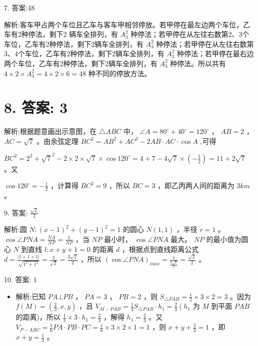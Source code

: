 \documentclass[10pt]{article}
\begin{document}
7. 答案:48

解析:客车甲占两个车位且乙车与客车甲相邻停放。若甲停在最左边两个车位，乙车有2种停法，剩下2 辆车全排列，有 \({A}_{3}^{2}\) 种停法；若甲停在从左往右数第2、3个车位，乙车有2种停法，剩下2辆车全排列，有 \({A}_{3}^{2}\) 种停法；若甲停在从左往右数第3、4个车位，乙车有2种停法，剩下2辆车全排列，有 \({A}_{3}^{2}\) 种停法；若甲停在最右边两个车位，乙车有2种停法，剩下2辆车全排列，有 \({A}_{3}^{2}\) 种停法。所以共有 \(4 \times  2 \times  {A}_{3}^{2} = 4 \times  2 \times  6 = {48}\) 种不同的停放方法。

\section*{8. 答案: 3}

解析:根据题意画出示意图，在 \(\bigtriangleup  {ABC}\) 中， \(\angle A = {80}^{ \circ  } + {40}^{ \circ  } = {120}^{ \circ  }\) ， \({AB} = 2\) ， \({AC} = \sqrt{7}\) 。由余弦定理 \(B{C}^{2} = A{B}^{2} + A{C}^{2} - {2AB} \cdot  {AC} \cdot  \cos A\) ,可得

\(B{C}^{2} = {2}^{2} + {\sqrt{7}}^{2} - 2 \times  2 \times  \sqrt{7} \times  \cos {120}^{ \circ  } = 4 + 7 - 4\sqrt{7} \times  \left( {-\frac{1}{2}}\right)  = {11} + 2\sqrt{7}\) 。又

\(\cos {120}^{ \circ  } =  - \frac{1}{2}\) ，计算得 \(B{C}^{2} = 9\) ，所以 \({BC} = 3\) ，即乙丙两人间的距离为 \({3km}\) 。

9. 答案: \(\frac{\sqrt{2}}{2}\)

解析:圆 \(N : {\left( x - 1\right) }^{2} + {\left( y - 1\right) }^{2} = 1\) 的圆心 \(N\left( {1,1}\right)\) ，半径 \(r = 1\) 。 \(\cos \angle {PNA} = \frac{NA}{NP} = \frac{1}{NP}\) ，当 \({NP}\) 最小时， \(\cos \angle {PNA}\) 最大。 \({NP}\) 的最小值为圆心 \(N\) 到直线 \(l : x + y + 1 = 0\) 的距离 \(d\) ，根据点到直线距离公式 \(d = \frac{\left| 1 + 1 + 1\right| }{\sqrt{{1}^{2} + {1}^{2}}} = \frac{3}{\sqrt{2}} = \frac{3\sqrt{2}}{2}\) ，所以 \({\left( \cos \angle {PNA}\right) }_{max} = \frac{1}{\frac{3\sqrt{2}}{2}} = \frac{\sqrt{2}}{2}\) 。

10. 答案: 1

\begin{itemize}\relax
\item\relax 解析:已知 \({PA} \bot  {PB}\) ， \({PA} = 3\) ， \({PB} = 2\) ，则 \({S}_{\bigtriangleup {PAB}} = \frac{1}{2} \times  3 \times  2 = 3\) 。因为 \(f\left( M\right)  = \left( {\frac{2}{3},x,y}\right)\) ，且 \({V}_{M - {PAB}} = \frac{1}{3}{S}_{\bigtriangleup {PAB}} \cdot  {h}_{1} = \frac{2}{3}\left( {{h}_{1}\text{ 为 }M\text{ 到平面 }{PAB}}\right.\) 的距离)，所以 \(\frac{1}{3} \times  3 \cdot  {h}_{1} = \frac{2}{3}\) ，解得 \({h}_{1} = \frac{2}{3}\) 。又 \({V}_{P - {ABC}} = \frac{1}{6}{PA} \cdot  {PB} \cdot  {PC} = \frac{1}{6} \times  3 \times  2 \times  1 = 1\) ，则 \(x + y + \frac{2}{3} = 1\) ，即 \(x + y = \frac{1}{3}\) 。
\end{itemize}
\end{document}
